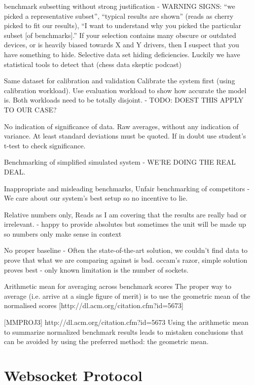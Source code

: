 \documentclass{uvamscse}
\begin{document}
benchmark subsetting without strong justification - WARNING SIGNS: “we picked a representative subset”, “typical results are shown” (reads as cherry picked to fit our results), “I want to understand why you picked the particular subset [of benchmarks].” If your selection contains many obscure or outdated devices, or is heavily biased towards X and Y drivers, then I suspect that you have something to hide.
Selective data set hiding deficiencies. Luckily we have statistical tools to detect that (chess data skeptic podcast)

Same dataset for calibration and validation
Calibrate the system first (using calibration workload). Use evaluation workload to show how accurate the model is. Both workloads need to be totally disjoint. - TODO: DOEST THIS APPLY TO OUR CASE?

No indication of significance of data.
Raw averages, without any indication of variance. At least standard deviations must be quoted. If in doubt use student's t-test to check significance.

Benchmarking of simplified simulated system - WE'RE DOING THE REAL DEAL.

Inappropriate and misleading benchmarks, Unfair benchmarking of competitors - We care about our system's best setup so no incentive to lie.

Relative numbers only, Reads as I am covering that the results are really bad or irrelevant. - happy to provide absolutes but sometimes the unit will be made up so numbers only make sense in context

No proper baseline - Often the state-of-the-art solution, we couldn't find data to prove that what we are comparing against is bad. occam's razor, simple solution proves best - only known limitation is the number of sockets.

Arithmetic mean for averaging across benchmark scores
The proper way to average (i.e. arrive at a single figure of merit) is to use the geometric mean of the normalised scores [http://dl.acm.org/citation.cfm?id=5673]

[MMPROJ3] http://dl.acm.org/citation.cfm?id=5673
Using the arithmetic mean to summarize normalized benchmark results leads to mistaken conclusions that can be avoided by using the preferred method: the geometric mean.

\section{Websocket Protocol}\label{Websocket Protocol}
\end{document}
